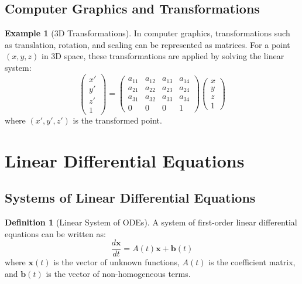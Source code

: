 \documentclass[12pt,a4paper]{article}
\theoremstyle{plain}
\theoremstyle{definition}
\newtheorem{definition}[theorem]{Definition}
\newtheorem{example}[theorem]{Example}
\begin{document}
\subsection{Computer Graphics and Transformations}

\begin{example}[3D Transformations]
In computer graphics, transformations such as translation, rotation, and scaling can be represented as matrices. For a point $(x, y, z)$ in 3D space, these transformations are applied by solving the linear system:
\begin{equation}
\begin{pmatrix}
x' \\
y' \\
z' \\
1
\end{pmatrix} = 
\begin{pmatrix}
a_{11} & a_{12} & a_{13} & a_{14} \\
a_{21} & a_{22} & a_{23} & a_{24} \\
a_{31} & a_{32} & a_{33} & a_{34} \\
0 & 0 & 0 & 1
\end{pmatrix}
\begin{pmatrix}
x \\
y \\
z \\
1
\end{pmatrix}
\end{equation}
where $(x', y', z')$ is the transformed point.
\end{example}

\section{Linear Differential Equations}

\subsection{Systems of Linear Differential Equations}

\begin{definition}[Linear System of ODEs]
A system of first-order linear differential equations can be written as:
\begin{equation}
\frac{d\mathbf{x}}{dt} = A(t)\mathbf{x} + \mathbf{b}(t)
\end{equation}
where $\mathbf{x}(t)$ is the vector of unknown functions, $A(t)$ is the coefficient matrix, and $\mathbf{b}(t)$ is the vector of non-homogeneous terms.
\end{definition}
\end{document}
